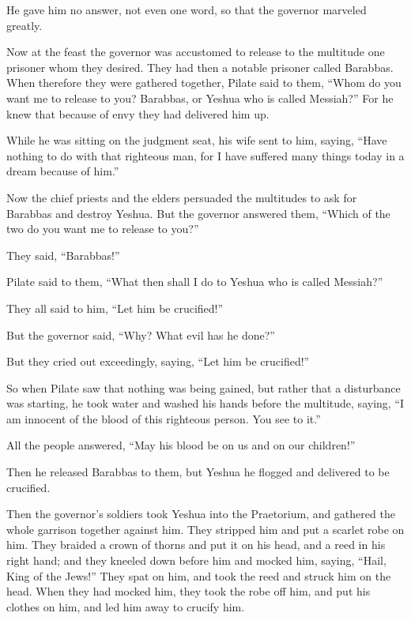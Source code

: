 \myverse{}He gave him no answer, not even one word, so that the governor
marveled greatly.

\myverse{}Now at the feast the governor was accustomed to release to the
multitude one prisoner whom they desired.
\myverse{}They had then a notable prisoner called Barabbas.
\myverse{}When therefore they were gathered together, Pilate said to them, “Whom do
you want me to release to you? Barabbas, or Yeshua who is called Messiah?”
\myverse{}For he knew that because of envy they had delivered him up.

\myverse{}While he was sitting on the judgment seat, his wife sent to
him, saying, “Have nothing to do with that righteous man, for I have suffered many things today in a dream
because of him.”

\myverse{}Now the chief priests and the elders persuaded the multitudes
to ask for Barabbas and destroy Yeshua.
\myverse{}But the governor answered them, “Which of the two do you want me to release
to you?”

They said, “Barabbas!”

\myverse{}Pilate said to them, “What then shall I do to Yeshua who is
called Messiah?”

They all said to him, “Let him be crucified!”

\myverse{}But the governor said, “Why? What evil has he done?”

But they cried out exceedingly, saying, “Let him be crucified!”

\myverse{}So when Pilate saw that nothing was being gained, but rather
that a disturbance was starting, he took water and washed his hands before the multitude, saying, “I am
innocent of the blood of this righteous person. You see to it.”

\myverse{}All the people answered, “May his blood be on us and on our
children!”

\myverse{}Then he released Barabbas to them, but Yeshua he flogged and
delivered to be crucified.

\myverse{}Then the governor’s soldiers took Yeshua into the Praetorium,
and gathered the whole garrison together against him.
\myverse{}They stripped him and put a scarlet robe on him.
\myverse{}They braided a crown of thorns and put it on his head, and a reed in his
right hand; and they kneeled down before him and mocked him, saying, “Hail, King of the Jews!”
\myverse{}They spat on him, and took the reed and struck him on the head.
\myverse{}When they had mocked him, they took the robe off him, and put his clothes
on him, and led him away to crucify him.

